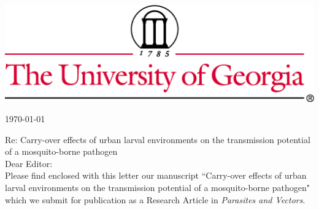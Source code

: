 \documentclass{letter}
\begin{document}

\begin{letter}


\vspace{-2in}
\includegraphics[width=\textwidth]{thin4c.png}

\begin{flushright}
\today
\end{flushright}


Re: Carry-over effects of urban larval environments on the transmission potential of a mosquito-borne pathogen\\

Dear Editor:\\

Please find enclosed with this letter our manuscript ``Carry-over effects of urban larval environments on the transmission potential of a mosquito-borne pathogen" which we submit for publication as a Research Article in \textit{Parasites and Vectors}.\\


\end{letter}
\end{document}
